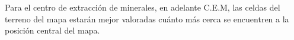 Para el centro de extracción de minerales, en adelante C.E.M, las celdas del terreno del mapa estarán mejor valoradas cuánto más cerca se encuentren a la posición central del mapa.
